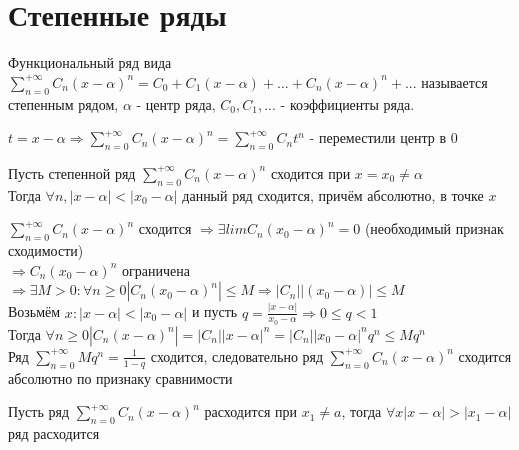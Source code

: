 \section{Степенные ряды}

\begin{Def}
	Функциональный ряд вида $\sum^{+\infty}_{n=0} C_n(x-\alpha)^n = C_0 + C_1(x-\alpha) + ... + C_n(x-\alpha)^n + ...$ называется степенным рядом, $\alpha$ - центр ряда, $C_0, C_1, ...$ - коэффициенты ряда.\\
\end{Def}

\begin{Note}
	$t = x - \alpha \Rightarrow \sum^{+\infty}_{n=0} C_n(x-\alpha)^n = \sum^{+\infty}_{n=0} C_nt^n$ - переместили центр в $0$\\
\end{Note}

\begin{Th}
	Пусть степенной ряд $\sum^{+\infty}_{n=0} C_n(x-\alpha)^n$ сходится при $x = x_0 \neq \alpha$\\
	Тогда $\forall n, |x-\alpha| < |x_0 - \alpha|$ данный ряд сходится, причём абсолютно, в точке $x$\\
\end{Th}

\begin{Proof}
	$\sum^{+\infty}_{n=0} C_n(x-\alpha)^n$ сходится $\Rightarrow \exists lim C_n(x_0 - \alpha)^n = 0$ (необходимый признак сходимости)\\
	$\Rightarrow C_n(x_0 - \alpha)^n$ ограничена $\Rightarrow \exists M > 0 : \forall n \geq 0 |C_n(x_0 - \alpha)^n| \leq M \Rightarrow |C_n||(x_0 - \alpha)| \leq M$\\
	Возьмём $x : |x-\alpha| < |x_0 - \alpha|$ и пусть $q = \frac{|x - \alpha|}{x_0 - \alpha} \Rightarrow 0 \leq q < 1$\\
	Тогда $\forall n \geq 0 |C_n(x-\alpha)^n| = |C_n||x-\alpha|^n = |C_n||x_0 - \alpha|^nq^n \leq Mq^n$\\
	Ряд $\sum^{+\infty}_{n=0} Mq^n = \frac{1}{1-q}$ сходится, следовательно ряд $\sum^{+\infty}_{n=0} C_n(x-\alpha)^n$ сходится абсолютно по признаку сравнимости\\ 
\end{Proof}

\begin{Note}[Следствие]
	Пусть ряд $\sum^{+\infty}_{n=0} C_n(x-\alpha)^n$ расходится при $x_1 \neq a$, тогда $\forall x |x - \alpha| > |x_1 - \alpha|$ ряд расходится
\end{Note}

